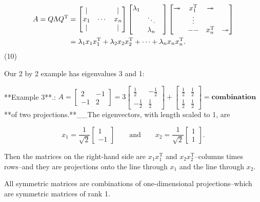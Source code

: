 \[\begin{split} A=Q\Lambda Q^{\mathrm{T}}&=\begin{bmatrix} \mid&&\mid\\ x_{1}&\cdots&x_{n}\\ \mid&&\mid\end{bmatrix}\begin{bmatrix}\lambda_{1}&&\\ &\ddots&\\ &\lambda_{n}\end{bmatrix}\begin{bmatrix}\multicolumn{1}{c}{\twoheadrightarrow}&x_{1}^{ \mathrm{T}}&\multicolumn{1}{c}{\twoheadrightarrow}\\ &\vdots&\\ &\mathsf{--}&x_{n}^{\mathrm{T}}&\multicolumn{1}{c}{\twoheadrightarrow} \end{bmatrix}\\ &=\lambda_{1}x_{1}x_{1}^{\mathrm{T}}+\lambda_{2}x_{2}x_{2}^{ \mathrm{T}}+\cdots+\lambda_{n}x_{n}x_{n}^{\mathrm{T}}.\end{split}\] (10)

Our 2 by 2 example has eigenvalues 3 and 1:

**Example 3**.: \(A=\begin{bmatrix}2&-1\\ -1&2\end{bmatrix}=3\begin{bmatrix}\frac{1}{2}&-\frac{1}{2}\\ -\frac{1}{2}&\frac{1}{2}\end{bmatrix}+\begin{bmatrix}\frac{1}{2}&\frac{1}{2}\\ \frac{1}{2}&\frac{1}{2}\end{bmatrix}=\mathbf{combination}\) **of two projections.**__The eigenvectors, with length scaled to 1, are

\[x_{1}=\frac{1}{\sqrt{2}}\begin{bmatrix}1\\ -1\end{bmatrix}\qquad\text{and}\qquad x_{2}=\frac{1}{\sqrt{2}}\begin{bmatrix} 1\\ 1\end{bmatrix}.\]

Then the matrices on the right-hand side are \(x_{1}x_{1}^{\mathrm{T}}\) and \(x_{2}x_{2}^{\mathrm{T}}\)--columns times rows--and they are projections onto the line through \(x_{1}\) and the line through \(x_{2}\).

All symmetric matrices are combinations of one-dimensional projections--which are symmetric matrices of rank 1.

 